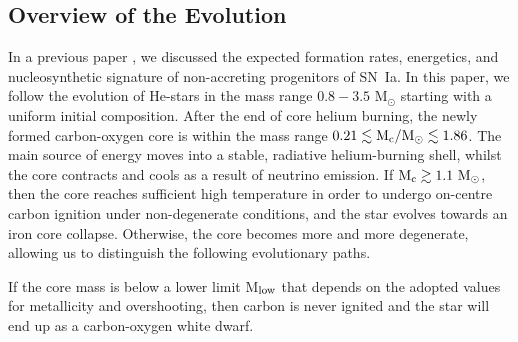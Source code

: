 \documentclass[../../main/thesis_msc.tex]{subfiles}
\begin{document}
    \subsection{Overview of the Evolution} \label{sec:overview}
    In a previous paper \citep[][hereafter Paper\, I]{Antoniadis2019}, we discussed the expected formation rates, energetics, and nucleosynthetic signature of non-accreting progenitors of SN\, Ia. In this paper, we follow the evolution of He-stars in the mass range $0.8 - 3.5$ M$_{\odot}$ starting with a uniform initial composition. After the end of core helium burning, the newly formed carbon-oxygen core is within the mass range $0.21 \lesssim \rm M_c/M_{\odot} \lesssim 1.86$. The main source of energy moves into a stable, radiative helium-burning shell, whilst the core contracts and cools as a result of neutrino emission. If $\rm M_c  \gtrsim 1.1 \ M_{\odot}$, then the core reaches sufficient high temperature in order to undergo on-centre carbon ignition under non-degenerate conditions, and the star evolves towards an iron core collapse. Otherwise, the core becomes more and more degenerate, allowing us to distinguish the following evolutionary paths.
    

    If the core mass is below a lower limit M$_{\rm low}$ that depends on the adopted values for metallicity and overshooting, then carbon is never ignited and the star will end up as a carbon-oxygen white dwarf. 
    
\end{document}

